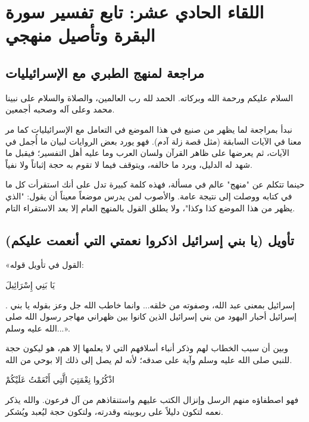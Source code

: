 \chapter{اللقاء الحادي عشر: تابع تفسير سورة البقرة وتأصيل منهجي}

\section{مراجعة لمنهج الطبري مع الإسرائيليات}
السلام عليكم ورحمة الله وبركاته. الحمد لله رب العالمين، والصلاة والسلام على نبينا محمد وعلى آله وصحبه أجمعين.

نبدأ بمراجعة لما يظهر من صنيع  في هذا الموضع في التعامل مع الإسرائيليات كما مر معنا في الآيات السابقة (مثل قصة زلة آدم). فهو يورد بعض الروايات لبيان ما أُجمل في الآيات، ثم يعرضها على ظاهر القرآن ولسان العرب وما عليه أهل التفسير؛ فيقبل ما شهد له الدليل، ويرد ما خالفه، ويتوقف فيما لا تقوم به حجة إثباتاً ولا نفياً.

\begin{fawaid}
حينما تتكلم عن "منهج" عالم في مسألة، فهذه كلمة كبيرة تدل على أنك استقرأت كل ما في كتابه ووصلت إلى نتيجة عامة. والأصوب لمن يدرس موضعاً معيناً أن يقول: "الذي يظهر من هذا الموضع كذا وكذا"، ولا يطلق القول بالمنهج العام إلا بعد الاستقراء التام.
\end{fawaid}

\separator

\section{تأويل (يا بني إسرائيل اذكروا نعمتي التي أنعمت عليكم)}
 «القول في تأويل قوله: \begin{ayah}يَا بَنِي إِسْرَائِيلَ\end{ayah}. إسرائيل بمعنى عبد الله، وصفوته من خلقه... وانما خاطب الله جل وعز بقوله يا بني إسرائيل أحبار اليهود من بني إسرائيل الذين كانوا بين ظهراني مهاجر رسول الله صلى الله عليه وسلم...».

وبين  أن سبب الخطاب لهم وذكر أنباء أسلافهم التي لا يعلمها إلا هم، هو ليكون حجة للنبي صلى الله عليه وسلم وآية على صدقه؛ لأنه لم يصل إلى ذلك إلا بوحي من الله. 

 \begin{ayah}اذْكُرُوا نِعْمَتِيَ الَّتِي أَنْعَمْتُ عَلَيْكُمْ\end{ayah} فهو اصطفاؤه منهم الرسل وإنزال الكتب عليهم واستنقاذهم من آل فرعون. والله يذكر نعمه لتكون دليلاً على ربوبيته وقدرته، ولتكون حجة ليُعبد ويُشكر.

